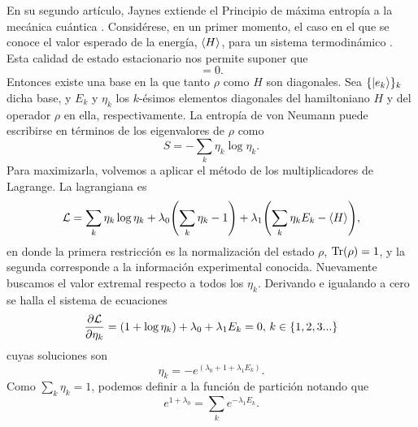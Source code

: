 En su segundo artículo, Jaynes extiende el Principio de máxima entropía a la mecánica cuántica \cite{JaynesII}. Considérese, en un primer momento, el caso en el que se conoce el valor esperado de la energía, $\expval{H}$, para un sistema termodinámico . Esta calidad de estado estacionario nos permite suponer que
\begin{equation}
    [\rho,H]=0.\nonumber
\end{equation}
Entonces existe una base en la que tanto $\rho$ como $H$ son diagonales. Sea $\{\ket{e_{k}}\}_{k}$ dicha base, y $E_{k}$ y $\eta_{k}$ los $k$-ésimos elementos diagonales del hamiltoniano $H$ y del operador $\rho$ en ella, respectivamente. La entropía de von Neumann puede escribirse en términos de los eigenvalores de $\rho$ como
\begin{equation}
    S=-\sum_{k}\eta_{k}\log{\eta_{k}}.\nonumber
\end{equation}
Para maximizarla, volvemos a aplicar el método de los multiplicadores de Lagrange. La lagrangiana es
\begin{equation}
    \mathcal{L}=\sum_{k}\eta_{k}\log{\eta_{k}}+\lambda_{0}\qty(\sum_{k}\eta_{k}-1)+\lambda_{1}\qty(\sum_{k}\eta_{k}E_{k}-\expval{H}),\nonumber
\end{equation}
en donde la primera restricción es la normalización del estado $\rho$, $\Tr(\rho)=1$, y la segunda corresponde a la información experimental conocida. Nuevamente buscamos el valor extremal respecto a todos los $\eta_{k}$. Derivando e igualando a cero se halla el sistema de ecuaciones  
\begin{equation}
    \frac{\partial \mathcal{L}}{\partial \eta_{k}}=(1+\log{\eta_{k}})+\lambda_{0}+\lambda_{1}E_{k}=0, \,k\in\{1,2,3...\}\nonumber
\end{equation}
cuyas soluciones son
\begin{equation}
    \eta_{k}=-e^{(\lambda_{0}+1+\lambda_{1}E_{k})}.\nonumber
\end{equation}
Como $\sum_{k}\eta_{k}=1$, podemos definir a la función de partición notando que
\begin{equation}
    e^{1+\lambda_{0}}=\sum_{k}e^{-\lambda_{1}E_{k}}.\nonumber
\end{equation}
